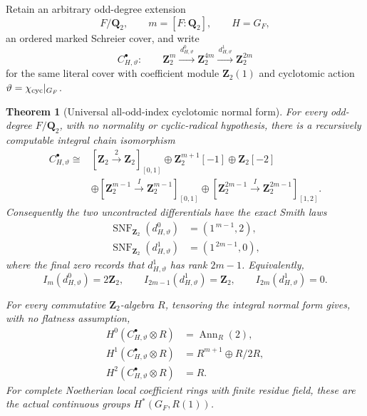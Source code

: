 \documentclass[11pt]{article}
\newtheorem{theorem}{Theorem}[section]
\theoremstyle{definition}
\begin{document}
Retain an arbitrary odd-degree extension
\[
F/\mathbf Q_2,\qquad m=[F:\mathbf Q_2],
\qquad H=G_F,
\]
an ordered marked Schreier cover, and write
\[
C_{H,\vartheta}^\bullet:
\qquad
\mathbf Z_2^m
\xrightarrow{\,d^0_{H,\vartheta}\,}
\mathbf Z_2^{4m}
\xrightarrow{\,d^1_{H,\vartheta}\,}
\mathbf Z_2^{2m}
\]
for the same literal cover with coefficient module
$\mathbf Z_2(1)$ and cyclotomic action
$\vartheta=\chi_{\rm cyc}|_{G_F}$.

\begin{theorem}[Universal all-odd-index cyclotomic normal form]
\label{thm:dyadic-f139-all-odd-index-cyclotomic-normal}
For every odd-degree $F/\mathbf Q_2$, with no
normality or cyclic-radical hypothesis, there is a
recursively computable integral chain isomorphism
\begin{equation}\label{eq:dyadic-f139-cyclotomic-strict-normal}
\boxed{
\begin{aligned}
C_{H,\vartheta}^\bullet\cong{}&
[\mathbf Z_2\xrightarrow{\ 2\ }\mathbf Z_2]_{[0,1]}
\oplus\mathbf Z_2^{m+1}[-1]\oplus\mathbf Z_2[-2]
\\
&\oplus
[\mathbf Z_2^{m-1}\xrightarrow{I}
 \mathbf Z_2^{m-1}]_{[0,1]}
\oplus
[\mathbf Z_2^{2m-1}\xrightarrow{I}
 \mathbf Z_2^{2m-1}]_{[1,2]} .
\end{aligned}}
\end{equation}
Consequently the two uncontracted differentials have
the exact Smith laws
\begin{equation}\label{eq:dyadic-f139-cyclotomic-two-smith-laws}
\boxed{
\begin{aligned}
\operatorname{SNF}_{\mathbf Z_2}(d^0_{H,\vartheta})
&=(1^{\,m-1},2),\\
\operatorname{SNF}_{\mathbf Z_2}(d^1_{H,\vartheta})
&=(1^{\,2m-1},0),
\end{aligned}}
\end{equation}
where the final zero records that
$d^1_{H,\vartheta}$ has rank $2m-1$.
Equivalently,
\begin{equation}\label{eq:dyadic-f139-cyclotomic-determinantal-ideals}
\boxed{
I_m(d^0_{H,\vartheta})=2\mathbf Z_2,\qquad
I_{2m-1}(d^1_{H,\vartheta})=\mathbf Z_2,\qquad
I_{2m}(d^1_{H,\vartheta})=0.
}
\end{equation}

For every commutative $\mathbf Z_2$-algebra $R$,
tensoring the integral normal form gives, with no
flatness assumption,
\begin{equation}\label{eq:dyadic-f139-cyclotomic-R-cohomology}
\boxed{
\begin{aligned}
H^0(C_{H,\vartheta}^\bullet\otimes R)
&=\operatorname{Ann}_{R}(2),\\
H^1(C_{H,\vartheta}^\bullet\otimes R)
&=R^{m+1}\oplus R/2R,\\
H^2(C_{H,\vartheta}^\bullet\otimes R)
&=R.
\end{aligned}}
\end{equation}
For complete Noetherian local coefficient rings with
finite residue field, these are the actual continuous
groups $H^*(G_F,R(1))$.
\end{theorem}
\end{document}
